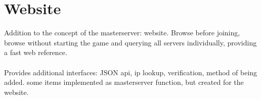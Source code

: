 \chapter{Website}
\label{chap:website}

Addition to the concept of the masterserver: website. Browse before joining, browse without starting the game and querying all servers individually, providing a fast web reference.\\
\\
Provides additional interfaces: JSON api, ip lookup, verification, method of being added. some items implemented as masterserver function, but created for the website.


